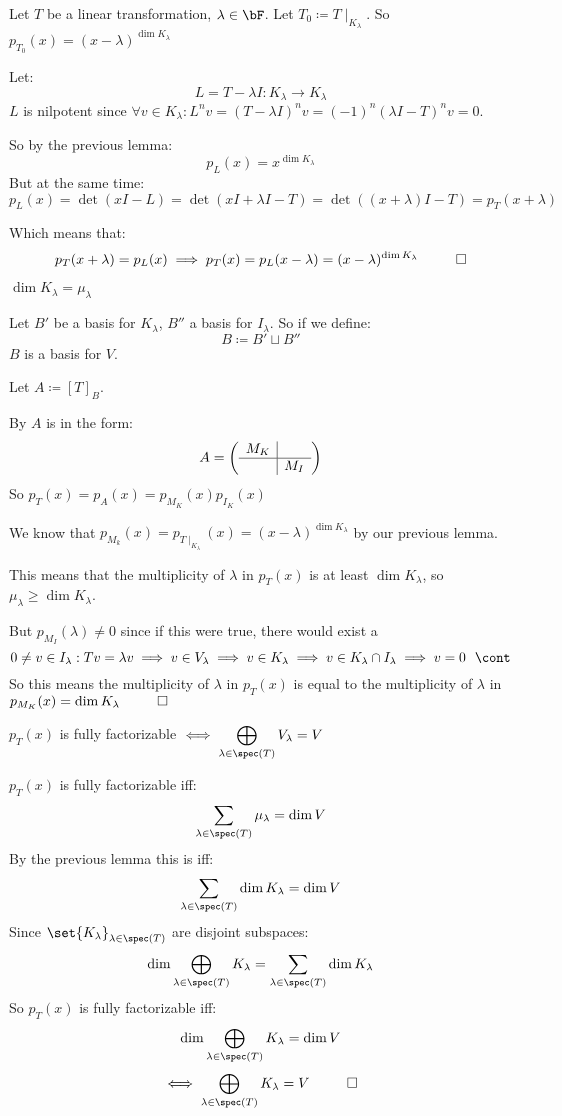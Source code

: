 \documentclass[10pt]{article}
\begin{document}
\begin{lemma}[invarCharPolyLemma]{Let $T$ be a linear transformation, $\lambda\in\bF$. Let $T_0\coloneqq T\mid_{K_\lambda}$. So $p_{T_0}(x)=(x-\lambda)^{\dim K_\lambda}$}

Let:
\[ L = T-\lambda I : K_\lambda \longrightarrow K_\lambda \]
$L$ is nilpotent since $\forall v\in K_\lambda: L^nv = (T-\lambda I)^nv = (-1)^n(\lambda I - T)^nv =0$.

So by the previous lemma:
\[ p_L(x) = x^{\dim K_\lambda} \]
But at the same time:
\[ p_L(x) = \det(xI - L) = \det(xI + \lambda I - T) = \det((x+\lambda)I-T) = p_T(x+\lambda) \]

Which means that:
\[ p_T(x+\lambda) = p_L(x) \implies p_T(x) = p_L(x-\lambda) = (x-\lambda)^{\dim K_\lambda}  ~~ \qed \]

\end{lemma}

\newpage
\begin{lemma}{$\dim K_\lambda=\mu_\lambda$}

Let $B'$ be a basis for $K_\lambda$, $B''$ a basis for $I_\lambda$. So if we define:
\[ B\coloneqq B'\sqcup B'' \]
$B$ is a basis for $V$.

Let $A\coloneqq [T]_B$.

By  $A$ is in the form:
\[ A = \left(\begin{array}{c|c} M_K & \\\hline & M_I\end{array}\right) \]
So $p_T(x)=p_A(x)=p_{M_K}(x)p_{I_K}(x)$

We know that $\displaystyle p_{M_k}(x)=p_{T\mid_{K_\lambda}}(x)=(x-\lambda)^{\dim K_\lambda}$ by our previous lemma.

This means that the multiplicity of $\lambda$ in $p_T(x)$ is at least $\dim K_\lambda$, so $\mu_\lambda\geq\dim K_\lambda$.

But $p_{M_I}(\lambda)\neq0$ since if this were true, there would exist a \[ 0\neq v\in I_\lambda: Tv=\lambda v\implies v\in V_\lambda\implies v\in K_\lambda\implies v\in K_\lambda\cap I_\lambda\implies v=0 ~~\cont \]
So this means the multiplicity of $\lambda$ in $p_T(x)$ is equal to the multiplicity of $\lambda$ in $p_{M_K}(x)=\dim K_\lambda ~~ \qed$

\end{lemma}

\begin{theorem}{$p_T(x)$ is fully factorizable $\iff \displaystyle\bigoplus_{\lambda\in\spec(T)} V_\lambda = V$}

$p_T(x)$ is fully factorizable iff:
\[ \sum_{\lambda\in\spec(T)}\mu_\lambda = \dim V \]
By the previous lemma this is iff:
\[ \sum_{\lambda\in\spec(T)}\dim K_\lambda = \dim V \]
Since $\displaystyle\set{K_\lambda}_{\lambda\in\spec(T)}$ are disjoint subspaces:
\[ \dim\bigoplus_{\lambda\in\spec(T)} K_\lambda = \sum_{\lambda\in\spec(T)}\dim K_\lambda \]
So $p_T(x)$ is fully factorizable iff:
\[ \dim\bigoplus_{\lambda\in\spec(T)} K_\lambda = \dim V \]
\[ \iff \bigoplus_{\lambda\in\spec(T)} K_\lambda = V ~~ \qed \]

\end{theorem}
\end{document}
